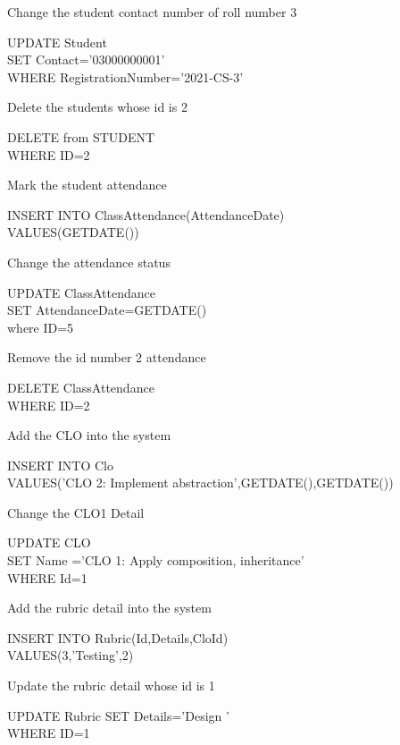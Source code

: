 \documentclass[10pt,a4paper]{article}
\newenvironment{problem}[2][Problem]{\begin{trivlist}
\item[\hskip \labelsep {\bfseries #1}\hskip \labelsep {\bfseries #2.}]}{\end{trivlist}}
\begin{document}
\begin{problem}{15}
Change the student contact number of roll number 3
\end{problem}
UPDATE Student\\ SET Contact='03000000001'\\ WHERE RegistrationNumber='2021-CS-3'
\begin{problem}{16}
Delete the students whose id is 2
\end{problem}
DELETE from STUDENT\\ WHERE ID=2

\begin{problem}{17}
Mark the student attendance 
\end{problem}
INSERT INTO ClassAttendance(AttendanceDate) \\VALUES(GETDATE())
\begin{problem}{18}
Change the attendance status
\end{problem}
UPDATE ClassAttendance \\ SET AttendanceDate=GETDATE()\\ where ID=5

\begin{problem}{19}
Remove the id number 2 attendance 
\end{problem}
DELETE ClassAttendance\\ WHERE ID=2

\begin{problem}{20}
Add the CLO into the system
\end{problem}
INSERT INTO Clo \\VALUES('CLO 2: Implement abstraction',GETDATE(),GETDATE())

\begin{problem}{21}
Change the CLO1 Detail
\end{problem}
UPDATE CLO \\SET Name ='CLO 1: Apply composition, inheritance'\\ WHERE Id=1

\begin{problem}{22}
Add the rubric detail into the system 
\end{problem}
INSERT INTO Rubric(Id,Details,CloId) \\VALUES(3,'Testing',2)

\begin{problem}{23}
Update the rubric detail whose id is 1
\end{problem}
UPDATE Rubric SET Details='Design '\\ WHERE ID=1
\end{document}
